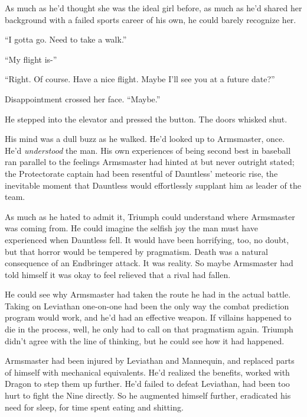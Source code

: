 As much as he'd thought she was the ideal girl before, as much as he'd shared her background with a failed sports career of his own, he could barely recognize her.



``I gotta go.  Need to take a walk.''



``My flight is-''



``Right.  Of course.  Have a nice flight.  Maybe I'll see you at a future date?''



Disappointment crossed her face.  ``Maybe.''



He stepped into the elevator and pressed the button.  The doors whisked shut.



His mind was a dull buzz as he walked.  He'd looked up to Armsmaster, once.  He'd \emph{understood} the man.  His own experiences of being second best in baseball ran parallel to the feelings Armsmaster had hinted at but never outright stated; the Protectorate captain had been resentful of Dauntless' meteoric rise, the inevitable moment that Dauntless would effortlessly supplant him as leader of the team.



As much as he hated to admit it, Triumph could understand where Armsmaster was coming from.  He could imagine the selfish joy the man must have experienced when Dauntless fell.  It would have been horrifying, too, no doubt, but that horror would be tempered by pragmatism.  Death was a natural consequence of an Endbringer attack.  It was reality.  So maybe Armsmaster had told himself it was okay to feel relieved that a rival had fallen.



He could see why Armsmaster had taken the route he had in the actual battle.  Taking on Leviathan one-on-one had been the only way the combat prediction program would work, and he'd had an effective weapon.  If villains happened to die in the process, well, he only had to call on that pragmatism again.  Triumph didn't agree with the line of thinking, but he could see how it had happened.



Armsmaster had been injured by Leviathan and Mannequin, and replaced parts of himself with mechanical equivalents.  He'd realized the benefits, worked with Dragon to step them up further.  He'd failed to defeat Leviathan, had been too hurt to fight the Nine directly.  So he augmented himself further, eradicated his need for sleep, for time spent eating and shitting.



